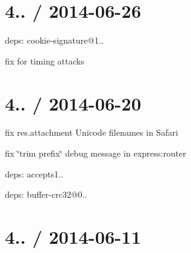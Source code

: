 {\ttfamily \section*{4.. / 2014-\/06-\/26 }}

{\ttfamily }

{\ttfamily 
\begin{DoxyItemize}
\item deps\+: cookie-\/signature@1..
\begin{DoxyItemize}
\item fix for timing attacks
\end{DoxyItemize}
\end{DoxyItemize}}

{\ttfamily \section*{4.. / 2014-\/06-\/20 }}

{\ttfamily }

{\ttfamily 
\begin{DoxyItemize}
\item fix {\ttfamily res.\+attachment} Unicode filenames in Safari
\item fix \char`\"{}trim prefix\char`\"{} debug message in {\ttfamily express\+:router}
\item deps\+: accepts1..
\item deps\+: buffer-\/crc32@0..
\end{DoxyItemize}}

{\ttfamily \section*{4.. / 2014-\/06-\/11 }}

{\ttfamily }

